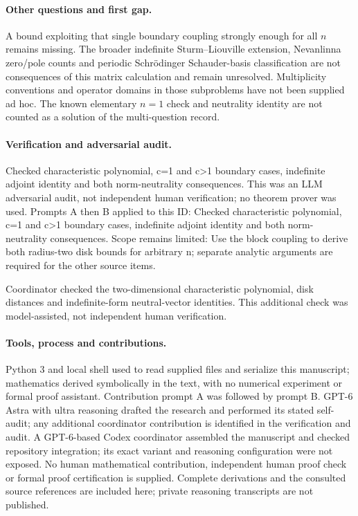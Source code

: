 \documentclass[11pt]{article}
\begin{document}
\paragraph{Other questions and first gap.}A bound exploiting that single boundary coupling strongly enough for all \(n\) remains missing. The broader indefinite Sturm--Liouville extension, Nevanlinna zero/pole counts and periodic Schrödinger Schauder-basis classification are not consequences of this matrix calculation and remain unresolved. Multiplicity conventions and operator domains in those subproblems have not been supplied ad hoc. The known elementary \(n=1\) check and neutrality identity are not counted as a solution of the multi-question record.

\paragraph{Verification and adversarial audit.}
Checked characteristic polynomial, c=1 and c>1 boundary cases, indefinite adjoint identity and both norm-neutrality consequences. This was an LLM adversarial audit, not independent human verification; no theorem prover was used. Prompts A then B applied to this ID: Checked characteristic polynomial, c=1 and c>1 boundary cases, indefinite adjoint identity and both norm-neutrality consequences. Scope remains limited: Use the block coupling to derive both radius-two disk bounds for arbitrary n; separate analytic arguments are required for the other source items.

Coordinator checked the two-dimensional characteristic polynomial, disk distances and indefinite-form neutral-vector identities. This additional check was model-assisted, not independent human verification.

\paragraph{Tools, process and contributions.}
Python 3 and local shell used to read supplied files and serialize this manuscript; mathematics derived symbolically in the text, with no numerical experiment or formal proof assistant. Contribution prompt A was followed by prompt B. GPT-6 Astra with ultra reasoning drafted the research and performed its stated self-audit; any additional coordinator contribution is identified in the verification and audit. A GPT-6-based Codex coordinator assembled the manuscript and checked repository integration; its exact variant and reasoning configuration were not exposed. No human mathematical contribution, independent human proof check or formal proof certification is supplied. Complete derivations and the consulted source references are included here; private reasoning transcripts are not published.
\end{document}
